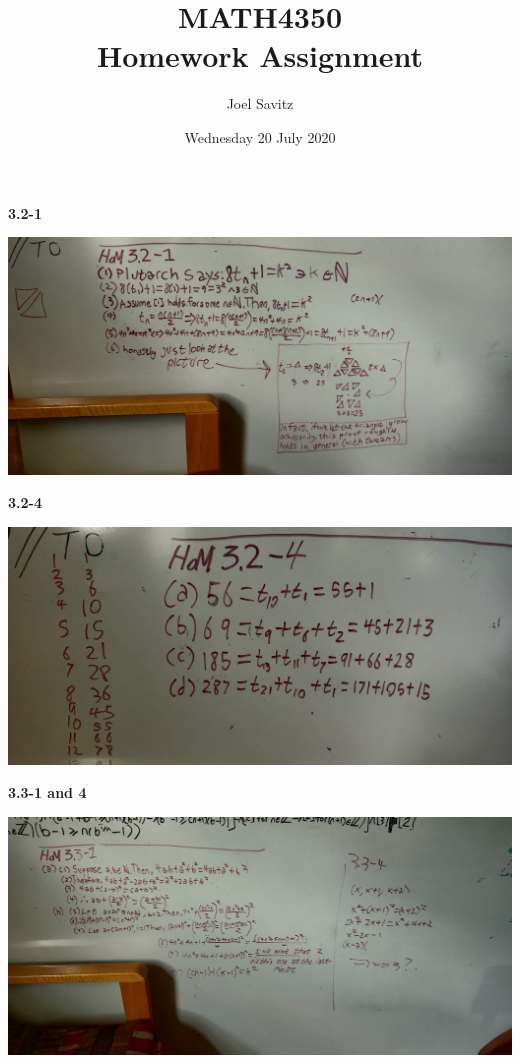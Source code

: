 \documentclass[12pt]{article}
\title{MATH4350 \\ Homework Assignment}
\author{Joel Savitz}
\date{Wednesday 20 July 2020}
\begin{document}
\maketitle

\textbf{3.2-1}
\medskip

\includegraphics[scale=0.08]{1.jpg}

\pagebreak
\textbf{3.2-4}
\medskip

\includegraphics[angle=180, scale=0.08]{2.jpg}

\pagebreak
\textbf{3.3-1 and 4}
\medskip

\includegraphics[scale=0.08]{3.jpg}
\end{document}
